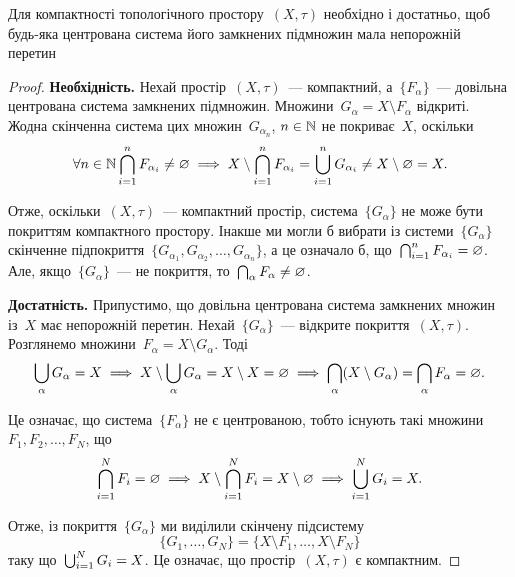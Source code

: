 \begin{theorem}
    Для компактності топологічного простору~$(X, \tau)$ необхідно і достатньо, щоб будь-яка центрована система його замкнених підмножин мала непорожній перетин
\end{theorem}

\begin{proof}
    \textbf{Необхідність.} Нехай простір~$(X, \tau)$~--- компактний, а~$\{F_\alpha\}$~--- довільна центрована система замкнених підмножин. Множини~$G_\alpha = X \setminus F_\alpha$ відкриті. Жодна скінченна система цих множин~$G_{\alpha_n}$, $n \in \mathbb{N}$ не покриває~$X$, оскільки
    \begin{equation*}
        \forall n \in \mathbb{N} \operatorname*{\bigcap}_{i = 1}^n F_{\alpha_i} \ne \varnothing \implies
        X \setminus \operatorname*{\bigcap}_{i = 1}^n F_{\alpha_i} =
        \operatorname*{\bigcup}_{i = 1}^n G_{\alpha_i} \ne X \setminus \varnothing = X.
    \end{equation*}

    Отже, оскільки~$(X, \tau)$~--- компактний простір, система~$\{G_\alpha\}$ не може бути покриттям компактного простору. Інакше ми могли б вибрати із системи~$\{G_\alpha\}$ скінченне підпокриття~$\{G_{\alpha_1}, G_{\alpha_2}, \dots, G_{\alpha_n}\}$, а це означало б, що~$\operatorname*{\bigcap}_{i = 1}^n F_{\alpha_i} = \varnothing$. Але, якщо~$\{G_\alpha\}$~--- не покриття, то~$\operatorname*{\bigcap}_\alpha F_\alpha \ne \varnothing$.

    \textbf{Достатність.} Припустимо, що довільна центрована система замкнених множин із~$X$ має непорожній перетин. Нехай~$\{G_\alpha\}$~--- відкрите покриття~$(X, \tau)$. Розглянемо множини~$F_\alpha = X \setminus G_\alpha$. Тоді
    \begin{equation*}
        \operatorname*{\bigcup}_\alpha G_\alpha = X \implies
        X \setminus \operatorname*{\bigcup}_\alpha G_\alpha = X \setminus X = \varnothing \implies
        \operatorname*{\bigcap}_\alpha (X \setminus G_\alpha) =
        \operatorname*{\bigcap}_\alpha F_\alpha = \varnothing.
    \end{equation*}

    Це означає, що система~$\{F_\alpha\}$ не є центрованою, тобто існують такі множини~$F_1, F_2, \dots, F_N$, що
    \begin{equation*}
        \operatorname*{\bigcap}_{i = 1}^N F_i = \varnothing \implies
        X \setminus \operatorname*{\bigcap}_{i = 1}^N F_i = X \setminus \varnothing \implies
        \operatorname*{\bigcup}_{i = 1}^N G_i = X.
    \end{equation*}

    Отже, із покриття~$\{G_\alpha\}$ ми виділили скінчену підсистему
    \begin{equation*}
        \{G_1, \dots, G_N\} = \{X \setminus F_1, \dots, X \setminus F_N\}
    \end{equation*}
    таку що~$\operatorname*{\bigcup}_{i = 1}^N G_i = X$. Це означає, що простір~$(X, \tau)$ є компактним.
\end{proof}

